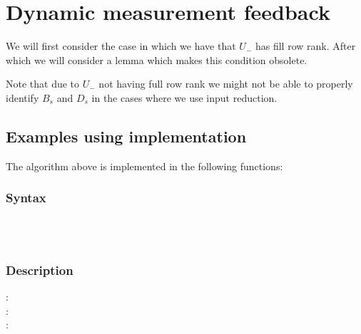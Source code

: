 \section{Dynamic measurement feedback}









We will first consider the case in which we have that $U_-$ has fill row rank. After which we will consider a lemma which makes this condition obsolete.





Note that due to $U_-$ not having full row rank we might not be able to properly identify $B_s$ and $D_s$ in the cases where we use input reduction.

\subsection{Examples using implementation}
The algorithm above is implemented in the following functions:
\subsubsection*{Syntax} 
 \\
 \\

\subsubsection*{Description} 
: \\
: \\
: 

